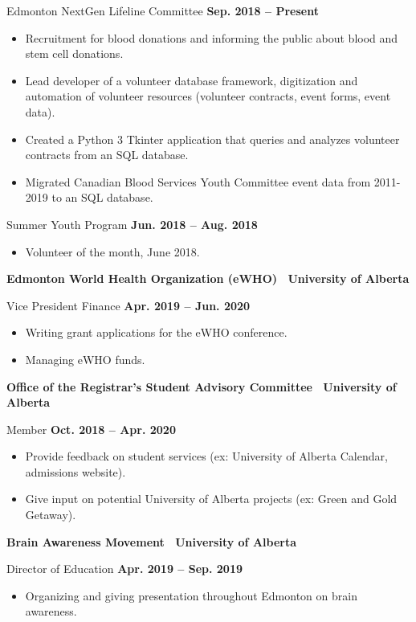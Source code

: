 \documentclass{article}
\begin{document}
    Edmonton NextGen Lifeline Committee \hfill \textbf{Sep. 2018 -- Present}
    \begin{itemize}
        \item Recruitment for blood donations and informing the public about blood and stem cell donations.
        \item Lead developer of a volunteer database framework, digitization and automation of volunteer resources (volunteer contracts, event forms, event data).
        \item Created a Python 3 Tkinter application that queries and analyzes volunteer contracts from an SQL database.
        \item Migrated Canadian Blood Services Youth Committee event data from 2011-2019 to an SQL database.
    \end{itemize}

    Summer Youth Program \hfill \textbf{Jun. 2018 -- Aug. 2018}
    \begin{itemize}
        \item Volunteer of the month, June 2018.
    \end{itemize}
    
    
    \textbf{Edmonton World Health Organization (eWHO) \textbar\ University of Alberta}

    Vice President Finance \hfill \textbf{Apr. 2019 -- Jun. 2020}
    \begin{itemize}
        \item Writing grant applications for the eWHO conference.
        \item Managing eWHO funds.
    \end{itemize}
    
    
    \textbf{Office of the Registrar's  Student Advisory Committee \textbar\ University of Alberta}

    Member \hfill \textbf{Oct. 2018 -- Apr. 2020}
    \begin{itemize}
        \item Provide feedback on student services (ex: University of Alberta Calendar, admissions website).
        \item Give input on potential University of Alberta projects (ex: Green and Gold Getaway).
    \end{itemize}


    \textbf{Brain Awareness Movement \textbar\ University of Alberta}

    Director of Education \hfill \textbf{Apr. 2019 -- Sep. 2019}
    \begin{itemize}
        \item Organizing and giving presentation throughout Edmonton on brain awareness.
    \end{itemize}
\end{document}
